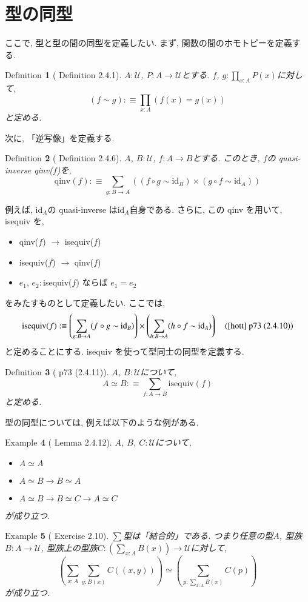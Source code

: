 \documentclass[11pt]{jsreport}
\theoremstyle{mystyle}
\newtheorem{df}{$\textrm{Definition}$}[section]
\newtheorem{ex}[df]{$\textrm{Example}$}
\newcommand{\bdf}{\begin{shadebox} \begin{df}}
\newcommand{\edf}{\end{df} \end{shadebox}}
\newcommand{\bex}{\begin{ex}}
\newcommand{\eex}{\end{ex}}
\newcommand{\U}{\mathcal{U}}
\newcommand{\id}{\textrm{id}}
\newcommand{\qinv}{\textrm{qinv}}
\newcommand{\iseq}{\textrm{isequiv}}
\newcommand{\0}{\textbf{0}}
\begin{document}
\section{型の同型}
ここで, 型と型の間の同型を定義したい. まず, 関数の間のホモトピーを定義する. 
\bdf[\cite{hott} Definition 2.4.1]
  $A : \U$, $P : A \to \U$とする. $f$, $g : \prod_{x : A} P(x)$に対して, 
  \[
    (f \sim g) :\equiv \prod_{x : A} (f(x) = g(x))
  \]
  と定める. 
\edf
次に, 「逆写像」を定義する. 
\bdf[\cite{hott} Definition 2.4.6]
  $A$, $B : \U$, $f : A \to B$とする. このとき, $f$の quasi-inverse qinv($f$)を, 
  \[
    \qinv(f) :\equiv \sum_{g : B \to A} ((f \circ g \sim \id_B) \times
                                                   (g \circ f \sim \id_A))
  \]
\edf
例えば, id$_A$の quasi-inverse はid$_A$自身である. さらに, この qinv を用いて, isequiv を, 
\begin{itemize}
  \item qinv($f$) $\to$ isequiv($f$)
  \item isequiv($f$) $\to$ qinv($f$)
  \item $e_1$, $e_2 :$isequiv($f$) ならば $e_1 = e_2$
\end{itemize}
をみたすものとして定義したい. ここでは, 
\[
  \iseq(f) :\equiv \left( \sum_{g : B \to A} (f \circ g \sim \id_B) \right) \times
                           \left( \sum_{h : B \to A} (h \circ f \sim \id_A) \right) \quad
                           \text{(\cite{hott} p73 (2.4.10))}
\]
と定めることにする. isequiv を使って型同士の同型を定義する. 
\bdf[\cite{hott} p73 (2.4.11)]
  $A$, $B : \U$について, 
  \[
    A \simeq B :\equiv \sum_{f : A \to B} \iseq(f)
  \]
  と定める. 
\edf
型の同型については, 例えば以下のような例がある. 
\bex[\cite{hott} Lemma 2.4.12]
$A$, $B$, $C : \U$について, 
\begin{itemize}
  \item $A \simeq A$
  \item $A \simeq B \to B \simeq A$
  \item $A \simeq B \to B \simeq C \to A \simeq C$
\end{itemize}
が成り立つ. 
\eex
\bex[\cite{hott} Exercise 2.10] \label{ex sigA}
  $\sum$型は「結合的」である. つまり任意の型$A$, 型族$B : A \to \U$, 
  型族上の型族$C : (\sum_{x : A} B(x)) \to \U$に対して, 
  \[
    \left( \sum_{x : A} \sum_{y : B(x)} C((x, y))\right) \simeq
    \left( \sum_{p : \sum_{x : A} B(x)} C(p) \right)
  \]
  が成り立つ. 
\eex
\end{document}
